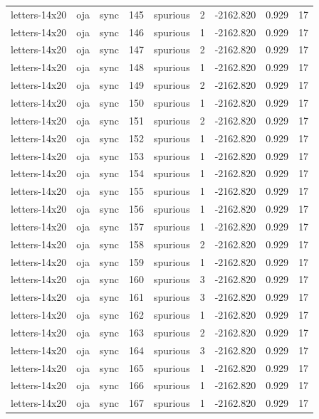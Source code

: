 \begin{tabular}{lllrlrrrr}
letters-14x20 & oja & sync & 145 & spurious & 2 & -2162.820 & 0.929 & 17 \\
letters-14x20 & oja & sync & 146 & spurious & 1 & -2162.820 & 0.929 & 17 \\
letters-14x20 & oja & sync & 147 & spurious & 2 & -2162.820 & 0.929 & 17 \\
letters-14x20 & oja & sync & 148 & spurious & 1 & -2162.820 & 0.929 & 17 \\
letters-14x20 & oja & sync & 149 & spurious & 2 & -2162.820 & 0.929 & 17 \\
letters-14x20 & oja & sync & 150 & spurious & 1 & -2162.820 & 0.929 & 17 \\
letters-14x20 & oja & sync & 151 & spurious & 2 & -2162.820 & 0.929 & 17 \\
letters-14x20 & oja & sync & 152 & spurious & 1 & -2162.820 & 0.929 & 17 \\
letters-14x20 & oja & sync & 153 & spurious & 1 & -2162.820 & 0.929 & 17 \\
letters-14x20 & oja & sync & 154 & spurious & 1 & -2162.820 & 0.929 & 17 \\
letters-14x20 & oja & sync & 155 & spurious & 1 & -2162.820 & 0.929 & 17 \\
letters-14x20 & oja & sync & 156 & spurious & 1 & -2162.820 & 0.929 & 17 \\
letters-14x20 & oja & sync & 157 & spurious & 1 & -2162.820 & 0.929 & 17 \\
letters-14x20 & oja & sync & 158 & spurious & 2 & -2162.820 & 0.929 & 17 \\
letters-14x20 & oja & sync & 159 & spurious & 1 & -2162.820 & 0.929 & 17 \\
letters-14x20 & oja & sync & 160 & spurious & 3 & -2162.820 & 0.929 & 17 \\
letters-14x20 & oja & sync & 161 & spurious & 3 & -2162.820 & 0.929 & 17 \\
letters-14x20 & oja & sync & 162 & spurious & 1 & -2162.820 & 0.929 & 17 \\
letters-14x20 & oja & sync & 163 & spurious & 2 & -2162.820 & 0.929 & 17 \\
letters-14x20 & oja & sync & 164 & spurious & 3 & -2162.820 & 0.929 & 17 \\
letters-14x20 & oja & sync & 165 & spurious & 1 & -2162.820 & 0.929 & 17 \\
letters-14x20 & oja & sync & 166 & spurious & 1 & -2162.820 & 0.929 & 17 \\
letters-14x20 & oja & sync & 167 & spurious & 1 & -2162.820 & 0.929 & 17 \\

\end{tabular}
